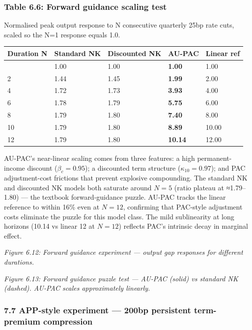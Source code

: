 \documentclass[
]{article}
\newcounter{none} %
\begin{document}
\subsubsection{Table 6.6: Forward guidance scaling
test}\label{table-6.6-forward-guidance-scaling-test}

Normalised peak output response to N consecutive quarterly 25bp rate
cuts, scaled so the N=1 response equals 1.0.

{\def\LTcaptype{none} %
\begin{longtable}[]{@{}lllll@{}}
\toprule\noalign{}
Duration N & Standard NK & Discounted NK & \textbf{AU-PAC} & Linear
ref \\
\midrule\noalign{}
\endhead
\bottomrule\noalign{}
\endlastfoot
1 & 1.00 & 1.00 & \textbf{1.00} & 1.00 \\
2 & 1.44 & 1.45 & \textbf{1.99} & 2.00 \\
4 & 1.72 & 1.73 & \textbf{3.93} & 4.00 \\
6 & 1.78 & 1.79 & \textbf{5.75} & 6.00 \\
8 & 1.79 & 1.80 & \textbf{7.40} & 8.00 \\
10 & 1.79 & 1.80 & \textbf{8.89} & 10.00 \\
12 & 1.79 & 1.80 & \textbf{10.14} & 12.00 \\
\end{longtable}
}

AU-PAC's near-linear scaling comes from three features: a high
permanent-income discount (\(\beta_c = 0.95\)); a discounted term
structure (\(\kappa_{10} = 0.97\)); and PAC adjustment-cost frictions
that prevent explosive compounding. The standard NK and discounted NK
models both saturate around \(N = 5\) (ratio plateau at ≈1.79--1.80) ---
the textbook forward-guidance puzzle. AU-PAC tracks the linear reference
to within 16\% even at \(N = 12\), confirming that PAC-style adjustment
costs eliminate the puzzle for this model class. The mild sublinearity
at long horizons (10.14 vs linear 12 at \(N = 12\)) reflects PAC's
intrinsic decay in marginal effect.

\emph{Figure 6.12: Forward guidance experiment --- output gap responses
for different durations.}

\emph{Figure 6.13: Forward guidance puzzle test --- AU-PAC (solid) vs
standard NK (dashed). AU-PAC scales approximately linearly.}

\subsubsection{7.7 APP-style experiment --- 200bp persistent
term-premium
compression}\label{app-style-experiment-200bp-persistent-term-premium-compression}
\end{document}
